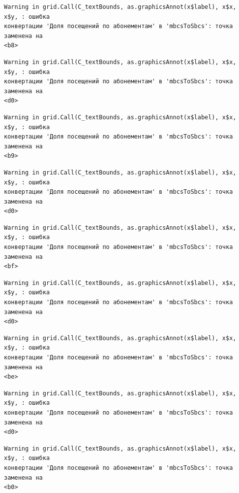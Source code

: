 \documentclass[
  letterpaper,
  DIV=11,
  numbers=noendperiod]{scrreprt}
\begin{document}
\begin{verbatim}
Warning in grid.Call(C_textBounds, as.graphicsAnnot(x$label), x$x, x$y, : ошибка
конвертации 'Доля посещений по абонементам' в 'mbcsToSbcs': точка заменена на
<b8>
\end{verbatim}

\begin{verbatim}
Warning in grid.Call(C_textBounds, as.graphicsAnnot(x$label), x$x, x$y, : ошибка
конвертации 'Доля посещений по абонементам' в 'mbcsToSbcs': точка заменена на
<d0>
\end{verbatim}

\begin{verbatim}
Warning in grid.Call(C_textBounds, as.graphicsAnnot(x$label), x$x, x$y, : ошибка
конвертации 'Доля посещений по абонементам' в 'mbcsToSbcs': точка заменена на
<b9>
\end{verbatim}

\begin{verbatim}
Warning in grid.Call(C_textBounds, as.graphicsAnnot(x$label), x$x, x$y, : ошибка
конвертации 'Доля посещений по абонементам' в 'mbcsToSbcs': точка заменена на
<d0>
\end{verbatim}

\begin{verbatim}
Warning in grid.Call(C_textBounds, as.graphicsAnnot(x$label), x$x, x$y, : ошибка
конвертации 'Доля посещений по абонементам' в 'mbcsToSbcs': точка заменена на
<bf>
\end{verbatim}

\begin{verbatim}
Warning in grid.Call(C_textBounds, as.graphicsAnnot(x$label), x$x, x$y, : ошибка
конвертации 'Доля посещений по абонементам' в 'mbcsToSbcs': точка заменена на
<d0>
\end{verbatim}

\begin{verbatim}
Warning in grid.Call(C_textBounds, as.graphicsAnnot(x$label), x$x, x$y, : ошибка
конвертации 'Доля посещений по абонементам' в 'mbcsToSbcs': точка заменена на
<be>
\end{verbatim}

\begin{verbatim}
Warning in grid.Call(C_textBounds, as.graphicsAnnot(x$label), x$x, x$y, : ошибка
конвертации 'Доля посещений по абонементам' в 'mbcsToSbcs': точка заменена на
<d0>
\end{verbatim}

\begin{verbatim}
Warning in grid.Call(C_textBounds, as.graphicsAnnot(x$label), x$x, x$y, : ошибка
конвертации 'Доля посещений по абонементам' в 'mbcsToSbcs': точка заменена на
<b0>
\end{verbatim}
\end{document}
